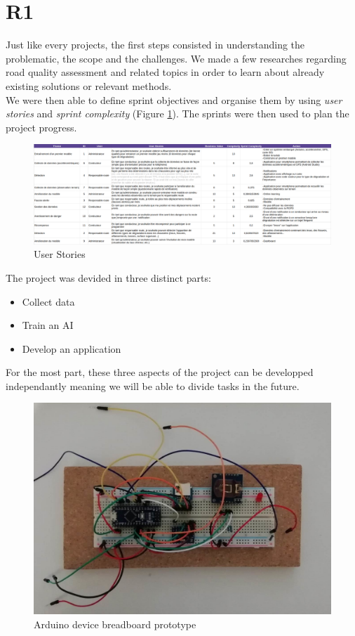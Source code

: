 \section{R1}
Just like every projects, the first steps consisted in understanding the problematic, the scope and the challenges. We made a few researches regarding road quality assessment and related topics in order to learn about already existing solutions or relevant methods.\\

We were then able to define sprint objectives and organise them by using \textit{user stories} and \textit{sprint complexity} (Figure \ref{user_stories}). The sprints were then used to plan the project progress.

\begin{figure}
    \center
    \includegraphics[scale=.2]{img/user_stories.png}
    \caption{User Stories}
    \label{user_stories}
\end{figure}

The project was devided in three distinct parts:
\begin{itemize}
\item Collect data
\item Train an AI
\item Develop an application
\end{itemize}
For the most part, these three aspects of the project can be developped independantly meaning we will be able to divide tasks in the future.\\

\begin{figure}
    \center
    \includegraphics[scale=.8]{img/breadboard.png}
    \caption{Arduino device breadboard prototype}
    \label{bread}
\end{figure}

